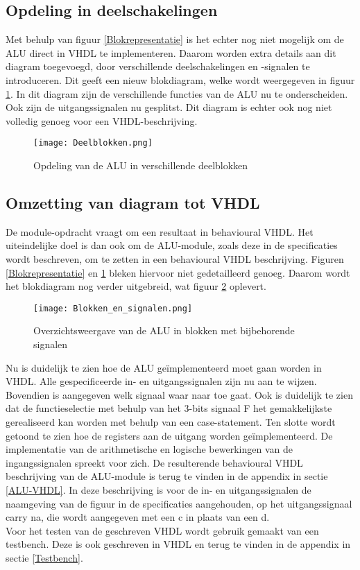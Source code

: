 \documentclass[11pt,twoside,a4paper]{article}
\begin{document}
\subsection{Opdeling in deelschakelingen}
Met behulp van figuur \ref{Blokrepresentatie} is het echter nog niet mogelijk om de ALU direct in VHDL te implementeren. Daarom worden extra details aan dit diagram toegevoegd, door verschillende deelschakelingen en -signalen te introduceren. Dit geeft een nieuw blokdiagram, welke wordt weergegeven in figuur \ref{Deelblokken}. In dit diagram zijn de verschillende functies van de ALU nu te onderscheiden. Ook zijn de uitgangssignalen nu gesplitst. Dit diagram is echter ook nog niet volledig genoeg voor een VHDL-beschrijving.
\begin{figure}[H]
\begin{center}
\texttt{[image: Deelblokken.png]}
\caption{Opdeling van de ALU in verschillende deelblokken}
\label{Deelblokken}
\end{center}
\end{figure}

\subsection{Omzetting van diagram tot VHDL}
De module-opdracht vraagt om een resultaat in behavioural VHDL. Het uiteindelijke doel is dan ook om de ALU-module, zoals deze in de specificaties wordt beschreven, om te zetten in een behavioural VHDL beschrijving. Figuren \ref{Blokrepresentatie} en \ref{Deelblokken} bleken hiervoor niet gedetailleerd genoeg. Daarom wordt het blokdiagram nog verder uitgebreid, wat figuur \ref{Overzicht} oplevert.
\begin{figure}[H]
\begin{center}
\texttt{[image: Blokken\_en\_signalen.png]}
\caption{Overzichtsweergave van de ALU in blokken met bijbehorende signalen}
\label{Overzicht}
\end{center}
\end{figure}
\noindent Nu is duidelijk te zien hoe de ALU ge\"implementeerd moet gaan worden in VHDL. Alle gespecificeerde in- en uitgangssignalen zijn nu aan te wijzen. Bovendien is aangegeven welk signaal waar naar toe gaat. Ook is duidelijk te zien dat de functieselectie met behulp van het 3-bits signaal F het gemakkelijkste gerealiseerd kan worden met behulp van een case-statement. Ten slotte wordt getoond te zien hoe de registers aan de uitgang worden ge\"implementeerd. De implementatie van de arithmetische en logische bewerkingen van de ingangssignalen spreekt voor zich. De resulterende behavioural VHDL beschrijving van de ALU-module is terug te vinden in de appendix in sectie \ref{ALU-VHDL}. In deze beschrijving is voor de in- en uitgangssignalen de naamgeving van de figuur in de specificaties aangehouden, op het uitgangssignaal carry na, die wordt aangegeven met een c in plaats van een d.\\
Voor het testen van de geschreven VHDL wordt gebruik gemaakt van een testbench. Deze is ook geschreven in VHDL en terug te vinden in de appendix in sectie \ref{Testbench}.
\end{document}
